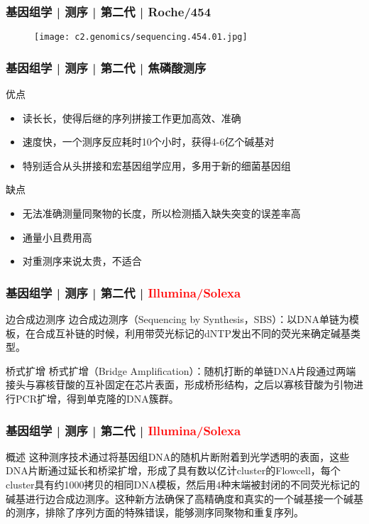 \begin{frame}
  \frametitle{基因组学 | 测序 | 第二代 | Roche/454}
  \begin{figure}
    \centering
    \texttt{[image: c2.genomics/sequencing.454.01.jpg]}
  \end{figure}
\end{frame}

\begin{frame}
  \frametitle{基因组学 | 测序 | 第二代 | 焦磷酸测序}
  \begin{block}{优点}
    \begin{itemize}
      \item 读长长，使得后继的序列拼接工作更加高效、准确
      \item 速度快，一个测序反应耗时10个小时，获得4-6亿个碱基对
      \item 特别适合从头拼接和宏基因组学应用，多用于新的细菌基因组
    \end{itemize}
  \end{block}
  \pause
  \begin{block}{缺点}
    \begin{itemize}
      \item 无法准确测量同聚物的长度，所以检测插入缺失突变的误差率高
      \item 通量小且费用高
      \item 对重测序来说太贵，不适合
    \end{itemize}
  \end{block}
\end{frame}

\begin{frame}
  \frametitle{基因组学 | 测序 | 第二代 | \textcolor{red}{Illumina/Solexa}}
  \begin{block}{边合成边测序}
边合成边测序（Sequencing by Synthesis，SBS）：以DNA单链为模板，在合成互补链的时候，利用带荧光标记的dNTP发出不同的荧光来确定碱基类型。
  \end{block}
  \pause
  \begin{block}{桥式扩增}
桥式扩增（Bridge Amplification）：随机打断的单链DNA片段通过两端接头与寡核苷酸的互补固定在芯片表面，形成桥形结构，之后以寡核苷酸为引物进行PCR扩增，得到单克隆的DNA簇群。
  \end{block}
\end{frame}

\begin{frame}
  \frametitle{基因组学 | 测序 | 第二代 | \textcolor{red}{Illumina/Solexa}}
  \begin{block}{概述}
这种测序技术通过将基因组DNA的随机片断附着到光学透明的表面，这些DNA片断通过延长和桥梁扩增，形成了具有数以亿计cluster的Flowcell，每个cluster具有约1000拷贝的相同DNA模板，然后用4种末端被封闭的不同荧光标记的碱基进行边合成边测序。这种新方法确保了高精确度和真实的一个碱基接一个碱基的测序，排除了序列方面的特殊错误，能够测序同聚物和重复序列。
  \end{block}
\end{frame}

